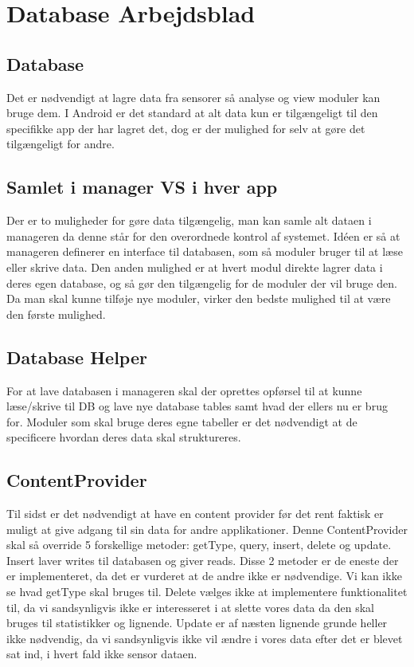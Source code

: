 \chapter{Database Arbejdsblad}
\section{Database}
Det er nødvendigt at lagre data fra sensorer så analyse og view moduler kan bruge dem.
I Android er det standard at alt data kun er tilgængeligt til den specifikke app der har lagret det, dog er der mulighed for selv at gøre det tilgængeligt for andre.

\section{Samlet i manager VS i hver app}
Der er to muligheder for gøre data tilgængelig, man kan samle alt dataen i manageren da denne står for den overordnede kontrol af systemet. Idéen er så at manageren definerer en interface til databasen, som så moduler bruger til at læse eller skrive data. 
Den anden mulighed er at hvert modul direkte lagrer data i deres egen database, og så gør den tilgængelig for de moduler der vil bruge den.
Da man skal kunne tilføje nye moduler, virker den bedste mulighed til at være den første mulighed.

\section{Database Helper}
For at lave databasen i manageren skal der oprettes opførsel til at kunne læse/skrive til DB og lave nye database tables samt hvad der ellers nu er brug for.
Moduler som skal bruge deres egne tabeller er det nødvendigt at de specificere hvordan deres data skal struktureres.

\section{ContentProvider}
Til sidst er det nødvendigt at have en content provider før det rent faktisk er muligt at give adgang til sin data for andre applikationer.
Denne ContentProvider skal så override 5 forskellige metoder:  getType, query, insert, delete og update.
Insert laver writes til databasen og giver reads.
Disse 2 metoder er de eneste der er implementeret, da det er vurderet at de andre ikke er nødvendige.
Vi kan ikke se hvad getType skal bruges til.
Delete vælges ikke at implementere funktionalitet til, da vi sandsynligvis ikke er interesseret i at slette vores data da den skal bruges til statistikker og lignende.
Update er af næsten lignende grunde heller ikke nødvendig, da vi sandsynligvis ikke vil ændre i vores data efter det er blevet sat ind, i hvert fald ikke sensor dataen.

